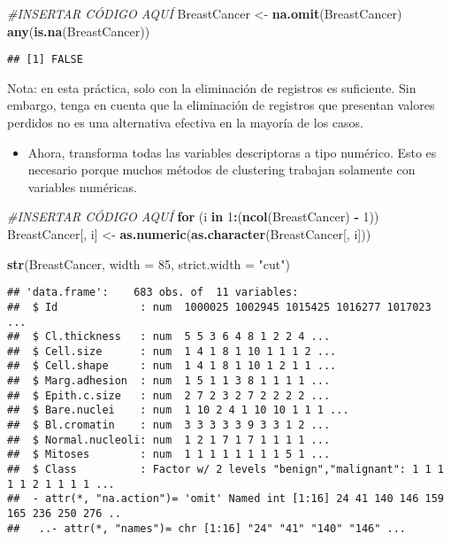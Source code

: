 \documentclass[]{article}
\newenvironment{Shaded}{\begin{snugshade}}{\end{snugshade}}
\newcommand{\CommentTok}[1]{\textcolor[rgb]{0.56,0.35,0.01}{\textit{#1}}}
\newcommand{\ControlFlowTok}[1]{\textcolor[rgb]{0.13,0.29,0.53}{\textbf{#1}}}
\newcommand{\DataTypeTok}[1]{\textcolor[rgb]{0.13,0.29,0.53}{#1}}
\newcommand{\DecValTok}[1]{\textcolor[rgb]{0.00,0.00,0.81}{#1}}
\newcommand{\KeywordTok}[1]{\textcolor[rgb]{0.13,0.29,0.53}{\textbf{#1}}}
\newcommand{\NormalTok}[1]{#1}
\newcommand{\OperatorTok}[1]{\textcolor[rgb]{0.81,0.36,0.00}{\textbf{#1}}}
\newcommand{\StringTok}[1]{\textcolor[rgb]{0.31,0.60,0.02}{#1}}
\providecommand{\tightlist}{%
  \setlength{\itemsep}{0pt}\setlength{\parskip}{0pt}}
\begin{document}
\begin{Shaded}
\begin{Highlighting}[]
\CommentTok{#INSERTAR CÓDIGO AQUÍ}
\NormalTok{BreastCancer <-}\StringTok{ }\KeywordTok{na.omit}\NormalTok{(BreastCancer) }
\KeywordTok{any}\NormalTok{(}\KeywordTok{is.na}\NormalTok{(BreastCancer))}
\end{Highlighting}
\end{Shaded}

\begin{verbatim}
## [1] FALSE
\end{verbatim}

Nota: en esta práctica, solo con la eliminación de registros es
suficiente. Sin embargo, tenga en cuenta que la eliminación de registros
que presentan valores perdidos no es una alternativa efectiva en la
mayoría de los casos.

\begin{itemize}
\tightlist
\item
  Ahora, transforma todas las variables descriptoras a tipo numérico.
  Esto es necesario porque muchos métodos de clustering trabajan
  solamente con variables numéricas.
\end{itemize}

\begin{Shaded}
\begin{Highlighting}[]
\CommentTok{#INSERTAR CÓDIGO AQUÍ}
\ControlFlowTok{for}\NormalTok{ (i }\ControlFlowTok{in} \DecValTok{1}\OperatorTok{:}\NormalTok{(}\KeywordTok{ncol}\NormalTok{(BreastCancer) }\OperatorTok{-}\StringTok{ }\DecValTok{1}\NormalTok{))}
\NormalTok{  BreastCancer[, i] <-}\StringTok{ }\KeywordTok{as.numeric}\NormalTok{(}\KeywordTok{as.character}\NormalTok{(BreastCancer[, i]))}

\KeywordTok{str}\NormalTok{(BreastCancer, }\DataTypeTok{width =} \DecValTok{85}\NormalTok{, }\DataTypeTok{strict.width =} \StringTok{"cut"}\NormalTok{)}
\end{Highlighting}
\end{Shaded}

\begin{verbatim}
## 'data.frame':    683 obs. of  11 variables:
##  $ Id             : num  1000025 1002945 1015425 1016277 1017023 ...
##  $ Cl.thickness   : num  5 5 3 6 4 8 1 2 2 4 ...
##  $ Cell.size      : num  1 4 1 8 1 10 1 1 1 2 ...
##  $ Cell.shape     : num  1 4 1 8 1 10 1 2 1 1 ...
##  $ Marg.adhesion  : num  1 5 1 1 3 8 1 1 1 1 ...
##  $ Epith.c.size   : num  2 7 2 3 2 7 2 2 2 2 ...
##  $ Bare.nuclei    : num  1 10 2 4 1 10 10 1 1 1 ...
##  $ Bl.cromatin    : num  3 3 3 3 3 9 3 3 1 2 ...
##  $ Normal.nucleoli: num  1 2 1 7 1 7 1 1 1 1 ...
##  $ Mitoses        : num  1 1 1 1 1 1 1 1 5 1 ...
##  $ Class          : Factor w/ 2 levels "benign","malignant": 1 1 1 1 1 2 1 1 1 1 ...
##  - attr(*, "na.action")= 'omit' Named int [1:16] 24 41 140 146 159 165 236 250 276 ..
##   ..- attr(*, "names")= chr [1:16] "24" "41" "140" "146" ...
\end{verbatim}
\end{document}
